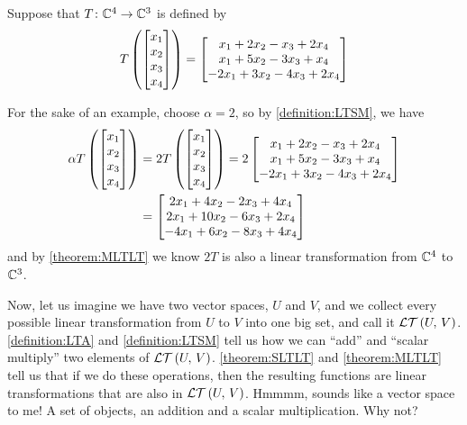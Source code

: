 \documentclass{ximera}
\begin{document}
\begin{example}

Suppose that $T\colon \mathbb{C}^{4}\rightarrow\mathbb{C}^{3}$ is defined by
\[
T\left(\begin{bmatrix}x_1\\x_2\\x_3\\x_4\end{bmatrix}\right)=
\begin{bmatrix}x_1+2x_2-x_3+2x_4\\x_1+5x_2-3x_3+x_4\\-2x_1+3x_2-4x_3+2x_4\end{bmatrix}
\]




For the sake of an example, choose $\alpha=2$, so by \ref{definition:LTSM}, we have
\begin{align*}
\alpha T\left(\begin{bmatrix}x_1\\x_2\\x_3\\x_4\end{bmatrix}\right)
&=2T\left(\begin{bmatrix}x_1\\x_2\\x_3\\x_4\end{bmatrix}\right)
 =2\begin{bmatrix}x_1+2x_2-x_3+2x_4\\x_1+5x_2-3x_3+x_4\\-2x_1+3x_2-4x_3+2x_4\end{bmatrix}\\
&=\begin{bmatrix}2x_1+4x_2-2x_3+4x_4\\2x_1+10x_2-6x_3+2x_4\\-4x_1+6x_2-8x_3+4x_4\end{bmatrix}
\end{align*}
and by \ref{theorem:MLTLT} we know $2T$ is also a linear transformation from $\mathbb{C}^{4}$ to $\mathbb{C}^{3}$.



\end{example}

Now, let us imagine we have two vector spaces, $U$ and $V$, and we collect every possible linear transformation from $U$ to $V$ into one big set, and call it $\mathcal{LT}\left(U,\,V\right)$.  \ref{definition:LTA} and \ref{definition:LTSM} tell us how we can ``add'' and ``scalar multiply'' two elements of $\mathcal{LT}\left(U,\,V\right)$.  \ref{theorem:SLTLT} and \ref{theorem:MLTLT} tell us that if we do these operations, then the resulting functions are linear transformations that are also in $\mathcal{LT}\left(U,\,V\right)$.   Hmmmm, sounds like a vector space to me!  A set of objects, an addition and a scalar multiplication.  Why not?
\end{document}
